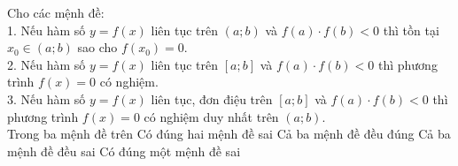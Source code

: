 \begin{ex}%
	Cho các mệnh đề:\\
	1. Nếu hàm số $y=f(x)$ liên tục trên $(a;b)$ và $f(a) \cdot f(b)<0$ thì tồn tại $x_0 \in (a;b)$ sao cho $f(x_0)=0$.\\
	2. Nếu hàm số $y=f(x)$ liên tục trên $[a;b]$ và $f(a) \cdot f(b)<0$ thì phương trình $f(x)=0$ có nghiệm.\\
	3. Nếu hàm số $y=f(x)$ liên tục, đơn điệu trên $[a;b]$ và $f(a) \cdot f(b)<0$ thì phương trình $f(x)=0$ có nghiệm duy nhất trên $(a;b)$.\\
	Trong ba mệnh đề trên
	\choice	
	{Có đúng hai mệnh đề sai}
	{Cả ba mệnh đề đều đúng}
	{Cả ba mệnh đề đều sai}	
	{\True Có đúng một mệnh đề sai}
\end{ex}